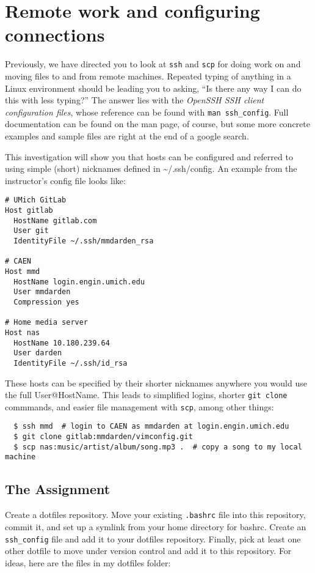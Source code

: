 \documentclass{article}
\begin{document}
\section{Remote work and configuring connections}
Previously, we have directed you to look at \texttt{ssh} and \texttt{scp}
for doing work on and moving files to and from remote machines. Repeated
typing of anything in a Linux environment should be leading you to asking,
``Is there any way I can do this with less typing?'' The answer lies with the
\emph{OpenSSH SSH client configuration files}, whose reference can be found
with \texttt{man ssh\_config}. Full documentation can be found on the man
page, of course, but some more concrete examples and sample files are right
at the end of a google search.

This investigation will show you that hosts can be configured and referred to
using simple (short) nicknames defined in \textasciitilde/.ssh/config. An
example from the instructor's config file looks like:

\begin{lstlisting}
# UMich GitLab
Host gitlab
  HostName gitlab.com
  User git
  IdentityFile ~/.ssh/mmdarden_rsa

# CAEN
Host mmd
  HostName login.engin.umich.edu
  User mmdarden
  Compression yes
  
# Home media server
Host nas
  HostName 10.180.239.64
  User darden
  IdentityFile ~/.ssh/id_rsa
\end{lstlisting}

These hosts can be specified by their shorter nicknames anywhere you would
use the full User@HostName. This leads to simplified logins, shorter
\texttt{git clone} commmands, and easier file management with \texttt{scp},
among other things:

\begin{lstlisting}
  $ ssh mmd  # login to CAEN as mmdarden at login.engin.umich.edu
  $ git clone gitlab:mmdarden/vimconfig.git
  $ scp nas:music/artist/album/song.mp3 .  # copy a song to my local machine
\end{lstlisting}
  

\subsection*{The Assignment}
Create a dotfiles repository. Move your existing \texttt{.bashrc} file into
this repository, commit it, and set up a symlink from your home directory for
bashrc. Create an \texttt{ssh\_config} file and add it to your dotfiles
repository. Finally, pick at least one other dotfile to move under version
control and add it to this repository. For ideas, here are the files in my
dotfiles folder:
\end{document}
